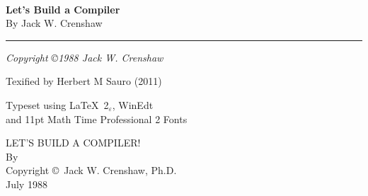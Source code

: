 \documentclass[10pt,twosided]{book}
\theoremstyle{itexmp}
\begin{document}
\frontmatter

\thispagestyle{empty}

\begin{center}
\textbf{\sffamily\Large \phantom{Ix}}\\
\textbf{\sffamily\Large Let's Build a Compiler}\\
\sffamily\Large By Jack W. Crenshaw
\rule{\linewidth}{0.5mm}
\end{center}

\vspace{0.3in}


\vspace{0.4in}

\begin{center}
{\em\hfill\large Copyright \copyright 1988 Jack W. Crenshaw}\\
\end{center}

\vspace{1in}
Texified by Herbert M Sauro (2011)

\vspace{1in}

Typeset using \LaTeX\ 2$_\varepsilon$, WinEdt\\
and 11pt Math Time Professional 2 Fonts
\vskip10pt

\tableofcontents

\mainmatter

\pagestyle{fancy}

\vspace{1in}

{\Large
\begin{center}
LET'S BUILD A COMPILER!\\ 
\medskip
By \\
\medskip 
Copyright \copyright\ Jack W. Crenshaw, Ph.D.\\ 
 July 1988
\end{center} }


\bigskip



















\cleardoublepage
{}
\end{document}
